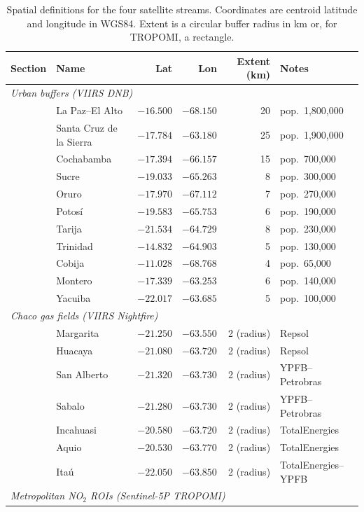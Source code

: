 \begin{table}[H]
\centering\small
\caption{Spatial definitions for the four satellite streams. Coordinates are centroid latitude and longitude in WGS84. Extent is a circular buffer radius in km or, for TROPOMI, a rectangle.}
\label{tab:spatial}
\begin{tabular}{llrrrl}
\toprule
Section & Name & Lat & Lon & Extent (km) & Notes \\
\midrule
\multicolumn{6}{l}{\textit{Urban buffers (VIIRS DNB)}} \\
& La Paz--El Alto & $-16.500$ & $-68.150$ & 20 & pop.\ 1,800,000 \\
& Santa Cruz de la Sierra & $-17.784$ & $-63.180$ & 25 & pop.\ 1,900,000 \\
& Cochabamba & $-17.394$ & $-66.157$ & 15 & pop.\ 700,000 \\
& Sucre & $-19.033$ & $-65.263$ & 8 & pop.\ 300,000 \\
& Oruro & $-17.970$ & $-67.112$ & 7 & pop.\ 270,000 \\
& Potosí & $-19.583$ & $-65.753$ & 6 & pop.\ 190,000 \\
& Tarija & $-21.534$ & $-64.729$ & 8 & pop.\ 230,000 \\
& Trinidad & $-14.832$ & $-64.903$ & 5 & pop.\ 130,000 \\
& Cobija & $-11.028$ & $-68.768$ & 4 & pop.\ 65,000 \\
& Montero & $-17.339$ & $-63.253$ & 6 & pop.\ 140,000 \\
& Yacuiba & $-22.017$ & $-63.685$ & 5 & pop.\ 100,000 \\
\midrule
\multicolumn{6}{l}{\textit{Chaco gas fields (VIIRS Nightfire)}} \\
& Margarita & $-21.250$ & $-63.550$ & 2 (radius) & Repsol \\
& Huacaya & $-21.080$ & $-63.720$ & 2 (radius) & Repsol \\
& San Alberto & $-21.320$ & $-63.730$ & 2 (radius) & YPFB--Petrobras \\
& Sabalo & $-21.280$ & $-63.730$ & 2 (radius) & YPFB--Petrobras \\
& Incahuasi & $-20.580$ & $-63.720$ & 2 (radius) & TotalEnergies \\
& Aquio & $-20.530$ & $-63.770$ & 2 (radius) & TotalEnergies \\
& Itaú & $-22.050$ & $-63.850$ & 2 (radius) & TotalEnergies--YPFB \\
\midrule
\multicolumn{6}{l}{\textit{Metropolitan NO$_2$ ROIs (Sentinel-5P TROPOMI)}} \\

\end{tabular}
\end{table}
